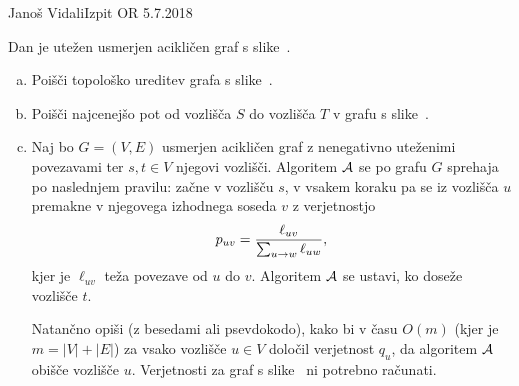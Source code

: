 \begin{naloga}{Janoš Vidali}{Izpit OR 5.7.2018}
\begin{vprasanje}[dag]
Dan je utežen usmerjen acikličen graf s slike~\fig{}.

\begin{enumerate}[(a)]
\item Poišči topološko ureditev grafa s slike~\fig{}.

\item Poišči najcenejšo pot od vozlišča $S$ do vozlišča $T$
v grafu s slike~\fig{}.

\item Naj bo $G = (V, E)$ usmerjen acikličen graf
z nenegativno uteženimi povezavami
ter $s, t \in V$ njegovi vozlišči.
Algoritem $\mathcal{A}$ se po grafu $G$ sprehaja po naslednjem pravilu:
začne v vozlišču $s$,
v vsakem koraku pa se iz vozlišča $u$ premakne
v njegovega izhodnega soseda $v$ z verjetnostjo
$$
p_{uv} = {\ell_{uv} \over \sum_{u \to w} \ell_{uw}} ,
$$
kjer je $\ell_{uv}$ teža povezave od $u$ do $v$.
Algoritem $\mathcal{A}$ se ustavi, ko doseže vozlišče $t$.

Natančno opiši (z besedami ali psevdokodo),
kako bi v času $O(m)$ (kjer je $m = |V| + |E|$)
za vsako vozlišče $u \in V$ določil verjetnost $q_u$,
da algoritem $\mathcal{A}$ obišče vozlišče $u$.
Verjetnosti za graf s slike~\fig{} ni potrebno računati.
\end{enumerate}

\begin{slika}
\end{slika}
\end{vprasanje}
\end{naloga}
